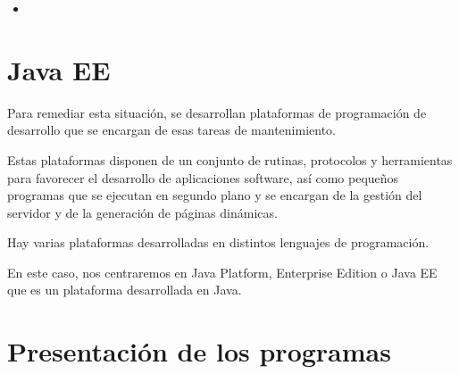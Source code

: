 \documentclass[compress, aspectratio=169]{beamer} %
\begin{document}
\begin{frame}
\begin{itemize}
			\item {}
			

		\end{itemize}

	\end{frame}

\section{Java EE}
	\begin{frame}
		Para remediar esta situación, se desarrollan plataformas de programación de desarrollo que
		se encargan de esas tareas de mantenimiento.
		
		Estas plataformas disponen de un conjunto de rutinas, protocolos y herramientas para favorecer
		el desarrollo de aplicaciones software, así como pequeños programas que se ejecutan en segundo
		plano y se encargan de la gestión del servidor y de la generación de páginas dinámicas.
		
		Hay varias plataformas desarrolladas en distintos lenguajes de programación.
		
		\pause
		
		\alert{En este caso, nos centraremos en Java Platform, Enterprise Edition o Java EE que es un plataforma
		desarrollada en Java.}
	\end{frame}

\section{Presentación de los programas}
\end{document}
